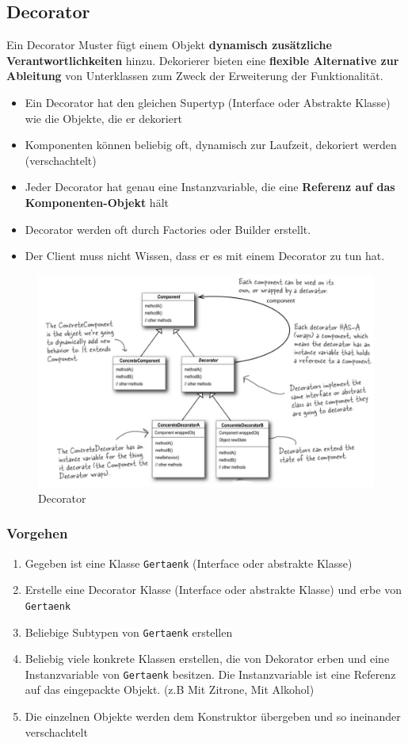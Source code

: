 \clearpage

\subsection{Decorator}
\label{sec:decorator}
Ein Decorator Muster fügt einem Objekt \textbf{dynamisch zusätzliche Verantwortlichkeiten} hinzu. Dekorierer bieten eine \textbf{flexible Alternative zur Ableitung} von Unterklassen zum Zweck der Erweiterung der Funktionalität.
\begin{itemize}
	\item Ein Decorator hat den gleichen Supertyp (Interface oder Abstrakte Klasse) wie die Objekte, die er dekoriert
	\item Komponenten können beliebig oft, dynamisch zur Laufzeit, dekoriert werden (verschachtelt)
	\item Jeder Decorator hat genau eine Instanzvariable, die eine \textbf{Referenz auf das Komponenten-Objekt} hält
	\item Decorator werden oft durch Factories oder Builder erstellt.
	\item Der Client muss nicht Wissen, dass er es mit einem Decorator zu tun hat.
\end{itemize}

\begin{figure}[h]
	\centering
	\includegraphics[width=0.7\linewidth]{images/decorator_pattern}
	\caption{Decorator}
	\label{fig:decoratorpattern}
\end{figure}

\subsubsection{Vorgehen}
\begin{enumerate}
	\item Gegeben ist eine Klasse \lstinline|Gertaenk| (Interface oder abstrakte Klasse)
	\item Erstelle eine Decorator Klasse (Interface oder abstrakte Klasse) und erbe von \lstinline|Gertaenk|
	\item Beliebige Subtypen von \lstinline|Gertaenk| erstellen
	\item Beliebig viele konkrete Klassen erstellen, die von Dekorator erben und eine Instanzvariable von \lstinline|Gertaenk| besitzen. Die Instanzvariable ist eine Referenz auf das eingepackte Objekt. (z.B Mit Zitrone, Mit Alkohol)
	\item Die einzelnen Objekte werden dem Konstruktor übergeben und so ineinander verschachtelt
\end{enumerate}


